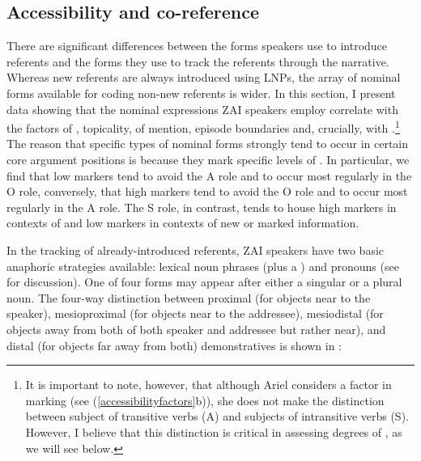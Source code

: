 \subsection{Accessibility and co-reference}

There are significant differences between the forms speakers use to introduce referents and the forms they use to track the referents through the narrative. Whereas new referents are always introduced using LNPs, the array of nominal forms available for coding non-new referents is wider. In this section, I present data showing that the nominal expressions ZAI speakers employ correlate with the  factors of , topicality,  of mention, episode boundaries and, crucially, with .\footnote{It is important to note, however, that although Ariel considers  a factor in  marking (see (\ref{accessibilityfactors}b)), she does not make the distinction between subject of transitive verbs (A) and subjects of intransitive verbs (S). However, I believe that this distinction is critical in assessing degrees of , as we will see below.} The reason that specific types of nominal forms strongly tend to occur in certain core argument positions is because they mark specific levels of . In particular, we find that low  markers tend to avoid the A role and to occur most regularly in the O role, conversely, that high  markers tend to avoid the O role and to occur most regularly in the A role. The S role, in contrast, tends to house high  markers in contexts of  and low  markers in contexts of new or marked information.


In the tracking of already-introduced referents, ZAI speakers have two basic anaphoric strategies available: lexical noun phrases (plus a ) and pronouns (see  for discussion). One of four  forms may appear after either a singular or a plural noun. The four-way distinction between proximal (for objects near to the speaker), mesioproximal (for objects near to the addressee), mesiodistal (for objects away from both of both speaker and addressee but rather near), and distal (for objects far away from both) demonstratives is shown in : 
 
